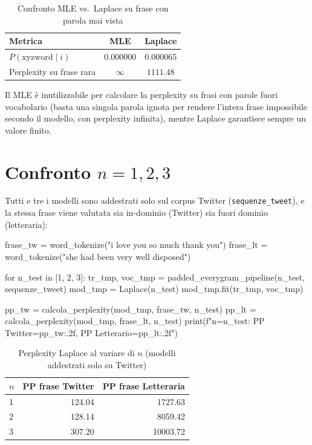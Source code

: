 ﻿\documentclass[12pt,a4paper]{article}
\begin{document}
\begin{table}[H]
  \centering
  \caption{Confronto MLE vs.\ Laplace su frase con parola mai vista}
  \begin{tabular}{lcc}
    \toprule
    \textbf{Metrica}              & \textbf{MLE}     & \textbf{Laplace} \\
    \midrule
    $P(\text{xyzword} \mid i)$    & $0.000000$       & $0.000065$       \\
    Perplexity su frase rara      & $\infty$         & $1111.48$        \\
    \bottomrule
  \end{tabular}
\end{table}

Il MLE è inutilizzabile per calcolare la perplexity su frasi con parole fuori vocabolario (basta una singola parola ignota per rendere l'intera frase impossibile secondo il modello, con perplexity infinita), mentre Laplace garantisce sempre un valore finito.

\section{Confronto $n=1, 2, 3$}

Tutti e tre i modelli sono addestrati solo sul corpus Twitter (\texttt{sequenze\_tweet}), e la stessa frase viene valutata sia in-dominio (Twitter) sia fuori dominio (letteraria):

\begin{pylisting}[title={Confronto della perplexity al variare di $n$}]
frase_tw = word_tokenize("i love you so much thank you")
frase_lt = word_tokenize("she had been very well disposed")

for n_test in [1, 2, 3]:
    tr_tmp, voc_tmp = padded_everygram_pipeline(n_test, sequenze_tweet)
    mod_tmp = Laplace(n_test)
    mod_tmp.fit(tr_tmp, voc_tmp)

    pp_tw = calcola_perplexity(mod_tmp, frase_tw, n_test)
    pp_lt = calcola_perplexity(mod_tmp, frase_lt, n_test)
    print(f"n={n_test}: PP Twitter={pp_tw:.2f}, PP Letterario={pp_lt:.2f}")
\end{pylisting}

\begin{table}[H]
  \centering
  \caption{Perplexity Laplace al variare di $n$ (modelli addestrati solo su Twitter)}
  \begin{tabular}{lrr}
    \toprule
    \textbf{$n$} & \textbf{PP frase Twitter} & \textbf{PP frase Letteraria} \\
    \midrule
    1 & 124.04 & 1727.63  \\
    2 & 128.14 & 8059.42  \\
    3 & 307.20 & 10003.72 \\
    \bottomrule
  \end{tabular}
\end{table}
\end{document}
